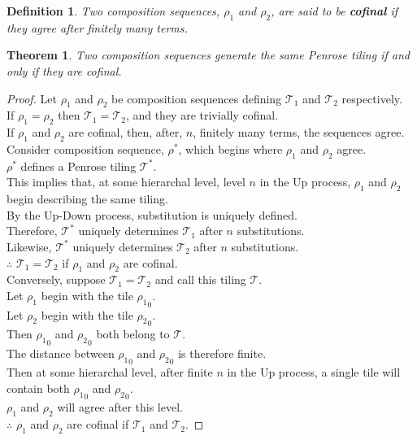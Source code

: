 \documentclass[
  oneside,
  11pt, a4paper,
  footinclude=true,
  headinclude=true,
  cleardoublepage=empty
]{scrbook}
\newtheorem{mydef}{Definition}
\newtheorem{mythm}{Theorem}
\begin{document}
\begin{mydef}
Two composition sequences, $\rho_1$ and $\rho_2$, are said to be \textbf{cofinal} if they agree after finitely many terms.
\end{mydef}

\begin{mythm}
Two composition sequences generate the same Penrose tiling if and only if they are cofinal.
\end{mythm}

\begin{proof}
Let $\rho_1$ and $\rho_2$ be composition sequences defining $\mathcal{T}_1$ and $\mathcal{T}_2$ respectively. \\[10pt]
If $\rho_1 = \rho_2$ then $\mathcal{T}_1 = \mathcal{T}_2$, and they are trivially cofinal.\\[10pt]
If $\rho_1$ and $\rho_2$ are cofinal, then, after, $n$, finitely many terms, the sequences agree.\\
Consider composition sequence, $\rho^*$, which begins where $\rho_1$ and $\rho_2$ agree.\\
$\rho^*$ defines a Penrose tiling  $\mathcal{T}^*$.\\
This implies that, at some hierarchal level, level $n$ in the Up process, $\rho_1$ and $\rho_2$ begin describing the same tiling.\\
By the Up-Down process, substitution is uniquely defined.\\
Therefore, $\mathcal{T}^*$ uniquely determines $\mathcal{T}_1$ after $n$ substitutions.\\
Likewise, $\mathcal{T}^*$ uniquely determines $\mathcal{T}_2$ after $n$ substitutions.\\
$\therefore$ $\mathcal{T}_1 = \mathcal{T}_2$ if  $\rho_1$ and $\rho_2$ are cofinal.\\[10pt]
Conversely, suppose $\mathcal{T}_1 = \mathcal{T}_2$ and call this tiling $\mathcal{T}$. \\
Let $\rho_1$ begin with the tile  ${\rho_1}_0$.\\
Let $\rho_2$ begin with the tile ${\rho_2}_0$.\\
Then ${\rho_1}_0$ and ${\rho_2}_0$ both belong to $\mathcal{T}$.\\
The distance between ${\rho_1}_0$ and ${\rho_2}_0$ is therefore finite.\\
Then at some hierarchal level, after finite $n$ in the Up process, a single tile will contain both ${\rho_1}_0$ and ${\rho_2}_0$.\\
$\rho_1$ and $\rho_2$ will agree after this level.\\
$\therefore$ $\rho_1$ and $\rho_2$ are cofinal if $\mathcal{T}_1$ and $\mathcal{T}_2$.
\end{proof}
\end{document}
